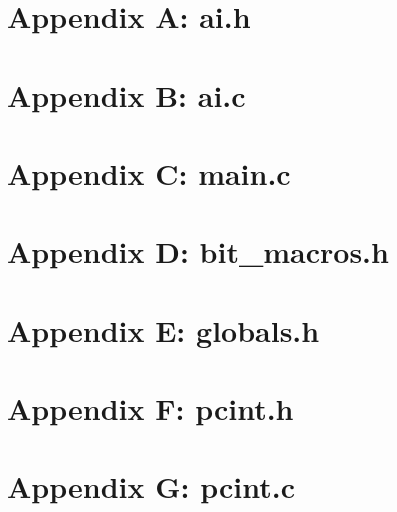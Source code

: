 \documentclass[letterpaper,11pt]{texMemo} %
\begin{document}
\section*{Appendix A: ai.h}
\begin{tiny}

\end{tiny}
\newpage

\section*{Appendix B: ai.c}
\begin{tiny}

\end{tiny}
\newpage

\section*{Appendix C: main.c}
\begin{tiny}

\end{tiny}
\newpage

\section*{Appendix D: bit\_macros.h}
\begin{tiny}

\end{tiny}
\newpage

\section*{Appendix E: globals.h}
\begin{tiny}

\end{tiny}
\newpage

\section*{Appendix F: pcint.h}
\begin{tiny}

\end{tiny}
\newpage

\section*{Appendix G: pcint.c}
\begin{tiny}

\end{tiny}
\newpage
\end{document}

